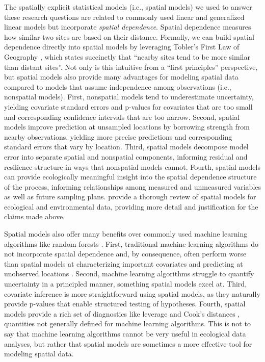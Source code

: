 \documentclass[
  letterpaper,
  DIV=11,
  numbers=noendperiod]{scrartcl}
\begin{document}
The spatially explicit statistical models (i.e., spatial models) we used
to answer these research questions are related to commonly used linear
and generalized linear models but incorporate \emph{spatial dependence}.
Spatial dependence measures how similar two sites are based on their
distance. Formally, we can build spatial dependence directly into
spatial models by leveraging Tobler's First Law of Geography
\citep{tobler1970computer}, which states succinctly that ``nearby sites
tend to be more similar than distant sites''. Not only is this intuitive
from a ``first principles'' perspective, but spatial models also provide
many advantages for modeling spatial data compared to models that assume
independence among observations (i.e., nonspatial models). First,
nonspatial models tend to underestimate uncertainty, yielding covariate
standard errors and p-values for covariates that are too small and
corresponding confidence intervals that are too narrow. Second, spatial
models improve prediction at unsampled locations by borrowing strength
from nearby observations, yielding more precise predictions and
corresponding standard errors that vary by location. Third, spatial
models decompose model error into separate spatial and nonspatial
components, informing residual and resilience structure in ways that
nonspatial models cannot. Fourth, spatial models can provide
ecologically meaningful insight into the spatial dependence structure of
the process, informing relationships among measured and unmeasured
variables as well as future sampling plans. \citet{zimmerman2024spatial}
provide a thorough review of spatial models for ecological and
environmental data, providing more detail and justification for the
claims made above.

Spatial models also offer many benefits over commonly used machine
learning algorithms like random forests
\citep{breiman2001random, cutler2007random, james2017introduction, kuhn2022tidy}.
First, traditional machine learning algorithms do not incorporate
spatial dependence and, by consequence, often perform worse than spatial
models at characterizing important covariates and predicting at
unobserved locations \citep{fox2020comparing}. Second, machine learning
algorithms struggle to quantify uncertainty in a principled manner,
something spatial models excel at. Third, covariate inference is more
straightforward using spatial models, as they naturally provide p-values
that enable structured testing of hypotheses. Fourth, spatial models
provide a rich set of diagnostics like leverage and Cook's distances
\citep{montgomery2021introduction}, quantities not generally defined for
machine learning algorithms. This is not to say that machine learning
algorithms cannot be very useful in ecological data analyses, but rather
that spatial models are sometimes a more effective tool for modeling
spatial data.
\end{document}
